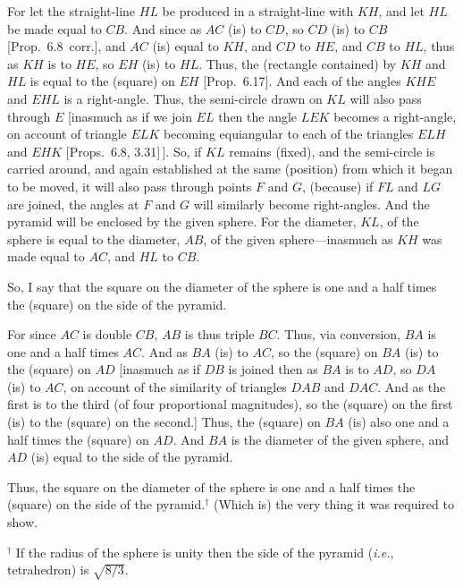 \begin{Parallel}{}{}
{For let the straight-line $HL$ be produced in a straight-line with $KH$, and let
$HL$ be made equal to $CB$. And since as $AC$ (is) to $CD$, 
so $CD$ (is) to $CB$ [Prop.~6.8~corr.], and $AC$ (is) equal to $KH$, and $CD$ to
$HE$, and $CB$ to $HL$, thus as $KH$ is to $HE$, so $EH$ (is) to $HL$.
Thus,  the (rectangle contained) by $KH$ and $HL$ is equal to the
(square) on $EH$ [Prop.~6.17]. And each of the angles $KHE$ and
$EHL$ is a right-angle. Thus, the semi-circle drawn on $KL$ 
will also pass through $E$ [inasmuch as if we join $EL$ then the angle
$LEK$ becomes a right-angle, on account of triangle $ELK$
becoming equiangular to each of the triangles $ELH$ and $EHK$ [Props.~6.8, 3.31]\,]. So, if
$KL$ remains (fixed), and the semi-circle is carried around, and again
established at the same (position) from which it began to be moved, 
it will also pass through points $F$ and $G$, (because) if  $FL$ and
$LG$ are joined, the angles at $F$ and $G$ will similarly become  right-angles. And the pyramid will be enclosed by the given sphere.
For the diameter, $KL$,  of the sphere is equal to the diameter, $AB$,
of the given sphere---inasmuch as $KH$ was made equal to $AC$, 
and $HL$ to $CB$. 

So, I say that the square on the diameter of the sphere is
one and a half times the (square) on the side of the pyramid.

For since $AC$ is double $CB$, $AB$ is thus triple $BC$. Thus,
via conversion, $BA$ is one and a half times $AC$. And as
$BA$ (is) to $AC$, so the (square) on $BA$ (is) to the (square) on $AD$
[inasmuch as if $DB$ is joined then as $BA$ is to $AD$, so
$DA$ (is) to $AC$, on account of the similarity of triangles
$DAB$ and $DAC$. And as the first is to the third (of four
proportional magnitudes), so the (square) on the first (is) to the
(square) on the second.] Thus, the (square) on $BA$
(is) also one and a half times the (square) on $AD$. 
And $BA$ is the diameter of the given sphere, and $AD$
(is) equal to the side of the pyramid.

Thus, the square on the diameter of the sphere is one and a half
times the (square) on the side of the pyramid.$^\dag$ (Which is) the very thing
it was required to show.}
\end{Parallel}
{\footnotesize\noindent$^\dag$ If the radius of the sphere is unity then the side of the pyramid ({\em i.e.}, tetrahedron) is $\sqrt{8/3}$.}

